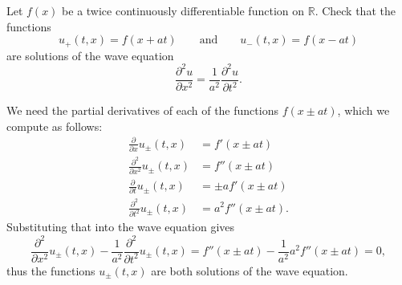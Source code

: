 Let $f(x)$ be a twice continuously differentiable function on $\mathbb R$.
Check that the functions
\[
u_+(t,x)=f(x+at)
\qquad
\text{and}
\qquad
u_-(t,x)=f(x-at)
\]
are solutions of the wave equation
\[
\frac{\partial^2 u}{\partial x^2}=\frac1{a^2}\frac{\partial^2 u}{\partial t^2}.
\]

\begin{loesung}
We need the partial derivatives of each of the functions
$f(x\pm at)$, which we compute as follows:
\begin{align*}
\frac{\partial}{\partial x}u_{\pm}(t,x)
&=f'(x\pm at)
\\
\frac{\partial^2}{\partial x^2}u_{\pm}(t,x)
&=f''(x\pm at)
\\
\frac{\partial}{\partial t}u_{\pm}(t,x)
&=\pm af'(x\pm at)
\\
\frac{\partial^2}{\partial t^2}u_{\pm}(t,x)
&=a^2f''(x\pm at).
\end{align*}
Substituting that into the wave equation gives
\[
\frac{\partial^2}{\partial x^2}u_{\pm}(t,x)
-\frac1{a^2}\frac{\partial^2}{\partial t^2}u_{\pm}(t,x)
=f''(x\pm at)
-\frac1{a^2} a^2f''(x\pm at)=0,
\]
thus the functions $u_{\pm}(t,x)$ are both solutions of the
wave equation.
\end{loesung}
